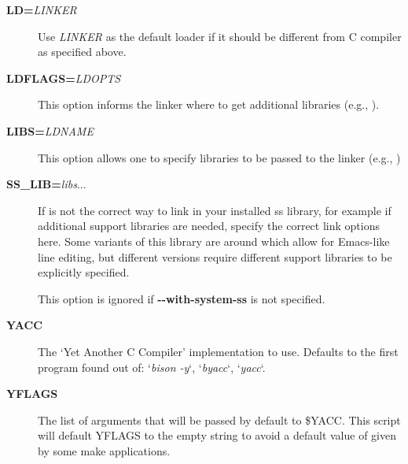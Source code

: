 \documentclass[letterpaper,10pt,english]{sphinxmanual}
\begin{document}
\begin{description}
\item[{\textbf{LD=}\emph{LINKER}}] \leavevmode
Use \emph{LINKER} as the default loader if it should be different from
C compiler as specified above.

\item[{\textbf{LDFLAGS=}\emph{LDOPTS}}] \leavevmode
This option informs the linker where to get additional libraries
(e.g., ).

\item[{\textbf{LIBS=}\emph{LDNAME}}] \leavevmode
This option allows one to specify libraries to be passed to the
linker (e.g., )

\item[{\textbf{SS\_LIB=}\emph{libs}...}] \leavevmode
If  is not the correct way to link in your installed ss
library, for example if additional support libraries are needed,
specify the correct link options here.  Some variants of this
library are around which allow for Emacs-like line editing, but
different versions require different support libraries to be
explicitly specified.

This option is ignored if \textbf{-}\textbf{-with-system-ss} is not specified.

\item[{\textbf{YACC}}] \leavevmode
The `Yet Another C Compiler' implementation to use. Defaults to
the first program found out of: `\emph{bison -y}`, `\emph{byacc}`,
`\emph{yacc}`.

\item[{\textbf{YFLAGS}}] \leavevmode
The list of arguments that will be passed by default to \$YACC.
This script will default YFLAGS to the empty string to avoid a
default value of  given by some make applications.

\end{description}
\end{document}

